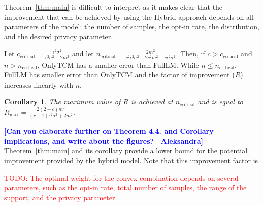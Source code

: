 \documentclass{article}
\newcommand{\ak}[1]{\textcolor{blue}{\bf\small [#1 --Aleksandra]}}
\newcommand\TODO[1]{\textcolor{red}{TODO: {#1}}}
\theoremstyle{plain}
\newtheorem*{cor}{Corollary}
\begin{document}
Theorem~\ref{thm:main} is difficult to interpret as it makes clear that the improvement that can be achieved by using the Hybrid approach depends on all parameters of the model: the number of samples, the opt-in rate, the distribution, and the desired privacy parameter.

Let $c_{\text{critical}} = \frac{\epsilon^2 \sigma^2}{\epsilon^2 \sigma^2+2 m^2}$ and let $n_{\text{critical}} = \frac{2 m^2}{c^2 \epsilon^2 \sigma^2+2 c^2 m^2-c \epsilon^2 \sigma^2}.$ Then, if $c>c_{\text{critical}}$ and $n > n_{\text{critical}}$, OnlyTCM has a smaller error than FullLM. While $n \leq n_{\text{critical}}$, FullLM has smaller error than OnlyTCM and the factor of improvement ($R$) increases linearly with $n$. 

\begin{cor}
The maximum value of $R$ is achieved at $n_{\text{critical}}$ and is equal to $R_{\text{max}} = \frac{2 (2-c) m^2}{(c-1) \epsilon^2 \sigma^2+2 m^2}.$
\end{cor}

\ak{Can you elaborate further on Theorem 4.4. and Corollary implications, and write about the figures?}
Theorem~\ref{thm:main} and its corollary provide a lower bound for the potential improvement provided by the hybrid model. Note that this improvement factor is 

\TODO{The optimal weight for the convex combination depends on several parameters, such as the opt-in rate, total number of samples, the range of the support, and the privacy parameter.}
\end{document}
